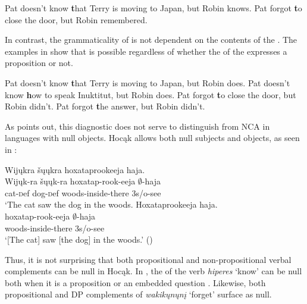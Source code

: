 \documentclass[output=paper]{LSP/langsci}
\begin{document}
\ea\label{ex:johnson:29}
\ea\label{ex:johnson:29a} 
Pat doesn't know {\textbf that Terry is moving to Japan}, but Robin knows.
\label{ex:johnson:29b}
\ex\label{ex:johnson:29c}
Pat forgot {\textbf to close the door}, but Robin remembered.
\label{ex:johnson:29d}
\z
\z

In contrast, the grammaticality of  is not dependent on the contents of the . The examples in  show that  is possible regardless of whether the  of the  expresses a proposition or not.
 
\ea\label{ex:johnson:30}
\ea 
Pat doesn't know {\textbf that Terry is moving to Japan}, but Robin does.
\ex 
Pat doesn't know {\textbf how to speak Inuktitut}, but Robin does.
\ex 
Pat forgot {\textbf to close the door}, but Robin didn't.
\ex 
Pat forgot {\textbf the answer}, but Robin didn't.
\z
\z

As \citet{Fortin2007} points out, this diagnostic does not serve to distinguish  from NCA in languages with null objects. Hocąk allows both null subjects and objects, as seen in :

 
\ea
\ea 
\glll Wijųkra šųųkra hoxataprookeeja haja.\\
Wijųk-ra šųųk-ra hoxatap-rook-eeja $\emptyset$-haja\\
cat-{\textsc def} dog-{\textsc def} woods-inside-there {\textsc 3s/o}-see\\
\trans `The cat saw the dog in the woods. 
\ex\label{ex:johnson:31b} 
\glll Hoxataprookeeja haja.\\
hoxatap-rook-eeja $\emptyset$-haja\\
woods-inside-there {\textsc 3s/o}-see\\
\trans `[The cat] saw [the dog] in the woods.' (\citealt[7]{JohnsonEtAl2013b})
\z
\z


Thus, it is not surprising that both propositional and non-propositional verbal complements can be null in Hocąk. In , the  of the verb \emph{hiperes} `know' can be null both when it is a proposition  or an embedded question . Likewise, both propositional  and DP   complements of \emph{wakikųnųnį} `forget' surface as null.
 
\end{document}
